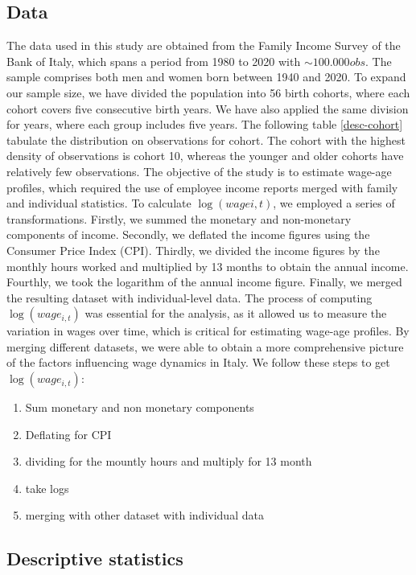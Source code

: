 \documentclass{sistedes}
\begin{document}
\subsection{Data}
The data used in this study are obtained from the Family Income Survey of the Bank of Italy, which spans a period from
1980 to 2020 with $\sim100.000 obs$. The sample comprises both men and women born between 1940 and 2020. To expand our
sample size, we have divided the population into 56 birth cohorts, where each cohort covers five consecutive birth
years. We have also applied the same division for years, where each group includes five years. The following table
\ref{desc-cohort} tabulate the distribution on observations for cohort. The cohort with the highest density of
observations is cohort 10, whereas the younger and older cohorts have relatively few observations. The objective of the
study is to estimate wage-age profiles, which required the use of employee income reports merged with family and
individual statistics. To calculate $\log(wagei,t)$, we employed a series of transformations. Firstly, we summed the
monetary and non-monetary components of income. Secondly, we deflated the income figures using the Consumer Price Index
(CPI). Thirdly, we divided the income figures by the monthly hours worked and multiplied by 13 months to obtain the
annual income. Fourthly, we took the logarithm of the annual income figure. Finally, we merged the resulting dataset
with individual-level data.
\newline
The process of computing \(\log(wage_{i,t})\) was essential for the analysis, as it allowed us to measure the variation
in wages over time, which is critical for estimating wage-age profiles. By merging different datasets, we were able to
obtain a more comprehensive picture of the factors influencing wage dynamics in Italy. We follow these steps to get
\(\log(wage_{i,t})\):
\begin{enumerate}
    \item Sum monetary and non monetary components 
    \item Deflating for CPI
    \item dividing for the mountly hours and multiply for 13 month
    \item take logs
    \item merging with other dataset with individual data
\end{enumerate}
\subsection{Descriptive statistics}
\end{document}
